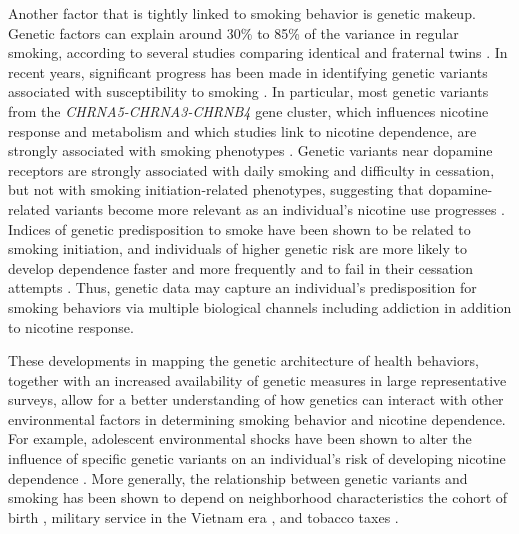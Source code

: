 \documentclass[11pt]{article}
\begin{document}
Another factor that is tightly linked to smoking behavior is genetic makeup.
Genetic factors can explain around 30\% to 85\% of the variance in regular smoking, according to several studies comparing identical and fraternal twins \citep{Heath1993, Sullivan1999, Hall2002, Li2003, Boardman2010}.
In recent years, significant progress has been made in identifying genetic variants associated with susceptibility to smoking \citep{Liu2010,Thorgeirsson2008,Thorgeirsson2010,TAG2010,GSCAN2019gwas}.
In particular, most genetic variants from the \textit{CHRNA5-CHRNA3-CHRNB4} gene cluster, which influences nicotine response and metabolism and which studies link to nicotine dependence, are strongly associated with smoking phenotypes \citep{stoker2013unraveling}.
Genetic variants near dopamine receptors are strongly associated with daily smoking and difficulty in cessation, but not with smoking initiation-related phenotypes, suggesting that dopamine-related variants become more relevant as an individual's nicotine use progresses \citep{GSCAN2019gwas}.
Indices of genetic predisposition to smoke have been shown to be related to smoking initiation, and individuals of higher genetic risk are more likely to develop dependence faster and more frequently and to fail in their cessation attempts \citep{belsky2013polygenic}.
Thus, genetic data may capture an individual's predisposition for smoking behaviors via multiple biological channels including addiction in addition to nicotine response.

These developments in mapping the genetic architecture of health behaviors, together with an increased availability of genetic measures in large representative surveys, allow for a better understanding of how genetics can interact with other environmental factors in determining smoking behavior and nicotine dependence.
For example, adolescent environmental shocks have been shown to alter the influence of specific genetic variants on an individual's risk of developing nicotine dependence \citep{bierut2014glimpse,chen2009interplay,johnson2010peer}.
More generally, the relationship between genetic variants and smoking has been shown to depend on neighborhood characteristics \citep{meyers2013interaction} the cohort of birth \citep{domingue2016cohort,Wedow2018}, military service in the Vietnam era \citep{schmitz2016long}, and tobacco taxes \citep{Fletcher2012,Slob2020}.
\end{document}
